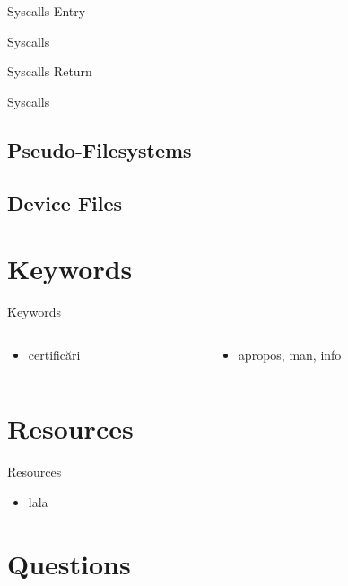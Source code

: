 \documentclass{workshop}
\begin{document}
\begin{frame}{Syscalls Entry}

\end{frame}

\begin{frame}{Syscalls}

\end{frame}

\begin{frame}{Syscalls Return}

\end{frame}

\begin{frame}{Syscalls}

\end{frame}

\subsection{Pseudo-Filesystems}

\subsection{Device Files}

\section{Keywords}
\begin{frame}{Keywords}
  \begin{columns}
    \begin{column}[l]{0.5\textwidth}
      \begin{itemize}
        \item certificări
      \end{itemize}
    \end{column}
    \begin{column}[l]{0.5\textwidth}
      \begin{itemize}
        \item apropos, man, info
      \end{itemize}
    \end{column}
  \end{columns}
\end{frame}

\section{Resources}
\begin{frame}{Resources}
  \begin{itemize}
  \item lala
  \end{itemize}
\end{frame}

\section{Questions}
\end{document}
